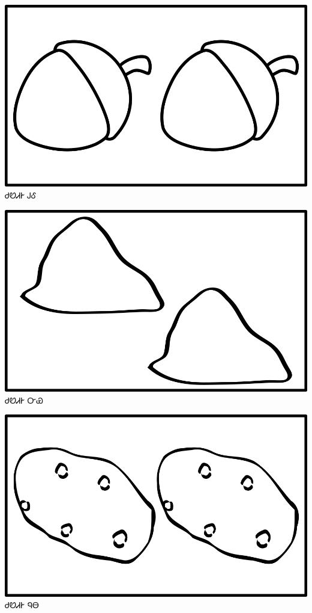 \documentclass[avery5371]{flashcards}%
\begin{document}
\begin{flashcard}{
\includegraphics[width=0.95\columnwidth,height=.51\columnwidth,keepaspectratio]{../artwork/objects-neutral/tali-gule}
}\Huge ᏧᏬᏗᎨ ᎫᎴ
\end{flashcard}

\begin{flashcard}{
\includegraphics[width=0.95\columnwidth,height=.51\columnwidth,keepaspectratio]{../artwork/objects-neutral/tali-nvya}
}\Huge ᏧᏬᏗᎨ ᏅᏯ
\end{flashcard}

\begin{flashcard}{
\includegraphics[width=0.95\columnwidth,height=.51\columnwidth,keepaspectratio]{../artwork/objects-neutral/tali-nuna}
}\Huge ᏧᏬᏗᎨ ᏄᎾ
\end{flashcard}
\end{document}
